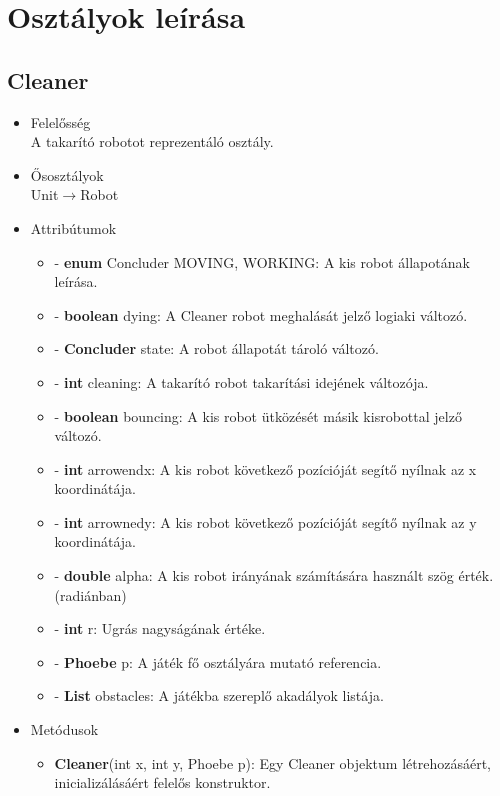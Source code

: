 \section{Osztályok leírása}

\subsection{Cleaner}
\begin{itemize}
\item Felelősség\\
A takarító robotot reprezentáló osztály.
\item Ősosztályok\\
Unit$\rightarrow$Robot
\item Attribútumok
    \begin{itemize}
        \item - \textbf{enum} Concluder {MOVING, WORKING}: A kis robot állapotának leírása.
        \item - \textbf{boolean} dying: A Cleaner robot meghalását jelző logiaki változó.
        \item - \textbf{Concluder} state: A robot állapotát tároló változó.
        \item - \textbf{int} cleaning: A takarító robot takarítási idejének változója.
        \item - \textbf{boolean} bouncing: A kis robot ütközését másik kisrobottal jelző változó.
        \item - \textbf{int} arrowendx: A kis robot következő pozícióját segítő nyílnak az x koordinátája.
        \item - \textbf{int} arrownedy: A kis robot következő pozícióját segítő nyílnak az y koordinátája.
        \item - \textbf{double} alpha: A kis robot irányának számítására használt szög érték.(radiánban)
        \item - \textbf{int} r: Ugrás nagyságának értéke.
        \item - \textbf{Phoebe} p: A játék fő osztályára mutató referencia.
        \item - \textbf{List} obstacles: A játékba szereplő akadályok listája.
    \end{itemize}
\item Metódusok
	\begin{itemize}
	    \item \textbf{Cleaner}(int x, int y, Phoebe p): Egy Cleaner objektum létrehozásáért, inicializálásáért felelős konstruktor.

\end{itemize}
\end{itemize}
